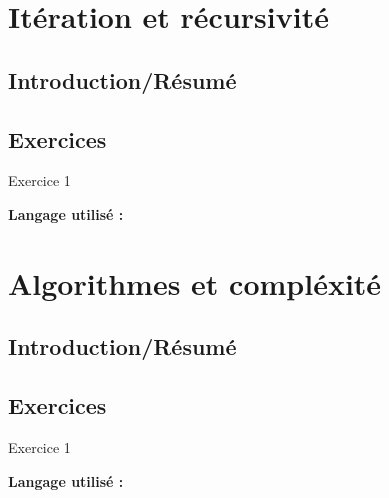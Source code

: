 \section{Itération et récursivité}

\subsection{Introduction/Résumé}

\subsection{Exercices}

\begin{Exercice}[Durée] Exercice 1\\

\begin{conseil}
\end{conseil}
    
\begin{solution}
\textbf{Langage utilisé :}
    
\end{solution}

\end{Exercice}

\section{Algorithmes et compléxité}

\subsection{Introduction/Résumé}

\subsection{Exercices}

\begin{Exercice}[Durée] Exercice 1\\

\begin{conseil}
\end{conseil}
    
\begin{solution}
\textbf{Langage utilisé :}
    
\end{solution}

\end{Exercice}


